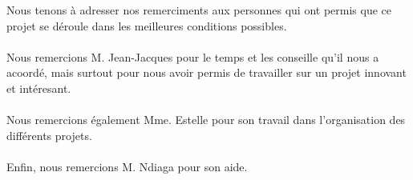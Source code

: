 Nous tenons à adresser nos remerciments aux personnes qui ont permis que ce projet se déroule dans les meilleures conditions possibles.\\
\\
Nous remercions M. Jean-Jacques  pour le temps et les conseille qu'il nous a acoordé, mais surtout pour nous avoir permis de travailler sur un projet innovant et intéresant.\\
\\
Nous remercions également Mme. Estelle  pour son travail dans l'organisation des différents projets. \\
\\
Enfin, nous remercions M. Ndiaga  pour son aide. 
